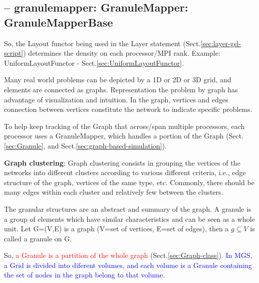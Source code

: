 \subsection{-- granulemapper: GranuleMapper: GranuleMapperBase}
\label{sec:GranuleMapperBase}
\label{sec:GranuleMapper}


So, the Layout functor being used in the Layer statement
(Sect.\ref{sec:layer-gsl-script}) determines the density on each processor/MPI
rank. Example: UniformLayoutFunctor - Sect.\ref{sec:UniformLayoutFunctor}.

Many real world problems can be depicted by a 1D or 2D or 3D grid, and
elements are connected as graphs.
Representation the problem by graph has advantage of visualization and
intuition. In the graph, vertices and edges connection between vertices
constitute the network to indicate specific problems.

To help keep tracking of the Graph that across/span multiple processors, each
processor uses a GranuleMapper, which handles a portion of the Graph
(Sect.\ref{sec:Granule}, and Sect.\ref{sec:graph-based-simulation}).

\begin{mdframed}


{\bf Graph clustering}: Graph clustering consists in grouping the vertices of
the networks into different clusters according to various different criteria,
i.e., edge structure of the graph, vertices of the same type, etc. Commonly,
there should be many edges within each cluster and relatively few between the
clusters.

The granular structures are an abstract and summary of the graph.
A granule is a group of elements which have similar characteristics and can be
seen as a whole unit. Let G=(V,E) is a graph (V=set of vertices, E=set of
edges), then a $g\subseteq V$ is called a granule on G.

So, \textcolor{red}{a Granule is a partition of the whole graph}
(Sect.\ref{sec:Graph-class}). \textcolor{blue}{In MGS, a Grid is divided into
diferent volumes, and each volume is a Granule containing the set of nodes in
the graph belong to that volume}.

\end{mdframed}


